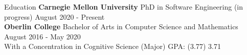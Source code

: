 \documentclass{resume}
\begin{document}
\begin{rSection}{Education}
{\bf Carnegie Mellon University}{ PhD in Software Engineering (in progress)} \hfill { August 2020 - Present} \\ 
{\bf Oberlin College}{ Bachelor of Arts in Computer Science and Mathematics} \hfill { August 2016 - May 2020} \\
With a Concentration in Cognitive Science \hfill {(Major) GPA: (3.77) 3.71}
\end{rSection}
\end{document}
